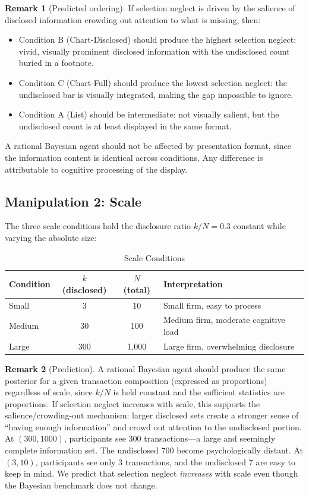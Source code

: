 \documentclass[12pt]{article}
\theoremstyle{definition}
\newtheorem{remark}{Remark}
\begin{document}
\begin{remark}[Predicted ordering]
If selection neglect is driven by the salience of disclosed information crowding out attention to what is missing, then:
\begin{itemize}[nosep]
\item Condition B (Chart-Disclosed) should produce the highest selection neglect: vivid, visually prominent disclosed information with the undisclosed count buried in a footnote.
\item Condition C (Chart-Full) should produce the lowest selection neglect: the undisclosed bar is visually integrated, making the gap impossible to ignore.
\item Condition A (List) should be intermediate: not visually salient, but the undisclosed count is at least displayed in the same format.
\end{itemize}
A rational Bayesian agent should not be affected by presentation format, since the information content is identical across conditions. Any difference is attributable to cognitive processing of the display.
\end{remark}


\subsection{Manipulation 2: Scale}
\label{sec:scale}

The three scale conditions hold the disclosure ratio $k/N = 0.3$ constant while varying the absolute size:

\begin{table}[h!]
\centering
\caption{Scale Conditions}
\label{tab:scale}
\begin{tabular}{lccl}
\toprule
Condition & $k$ (disclosed) & $N$ (total) & Interpretation \\
\midrule
Small & 3 & 10 & Small firm, easy to process \\
Medium & 30 & 100 & Medium firm, moderate cognitive load \\
Large & 300 & 1,000 & Large firm, overwhelming disclosure \\
\bottomrule
\end{tabular}
\end{table}

\begin{remark}[Prediction]
A rational Bayesian agent should produce the same posterior for a given transaction composition (expressed as proportions) regardless of scale, since $k/N$ is held constant and the sufficient statistics are proportions. If selection neglect increases with scale, this supports the salience/crowding-out mechanism: larger disclosed sets create a stronger sense of ``having enough information'' and crowd out attention to the undisclosed portion. At $(300, 1000)$, participants see 300 transactions---a large and seemingly complete information set. The undisclosed 700 become psychologically distant. At $(3, 10)$, participants see only 3 transactions, and the undisclosed 7 are easy to keep in mind. We predict that selection neglect \emph{increases} with scale even though the Bayesian benchmark does not change.
\end{remark}
\end{document}
